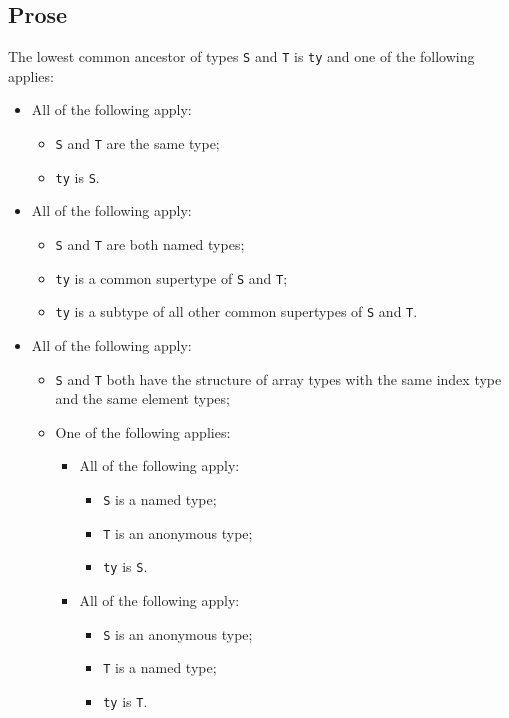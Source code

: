 \documentclass{book}
\begin{document}
\subsection{Prose}
  The lowest common ancestor of types \texttt{S} and \texttt{T} is \texttt{ty} and one of the following applies:
  \begin{itemize}
  \item All of the following apply:
    \begin{itemize}
    \item \texttt{S} and \texttt{T} are the same type;
    \item \texttt{ty} is \texttt{S}.
    \end{itemize}

  \item All of the following apply:
    \begin{itemize}
    \item \texttt{S} and \texttt{T} are both named types;
    \item \texttt{ty} is a common supertype of \texttt{S} and \texttt{T};
    \item \texttt{ty} is a subtype of all other common supertypes of \texttt{S} and \texttt{T}.
    \end{itemize}

  \item All of the following apply:
    \begin{itemize}
    \item \texttt{S} and \texttt{T} both have the structure of array types with the same index type
      and the same element types;

    \item One of the following applies:
      \begin{itemize}
      \item All of the following apply:
        \begin{itemize}
        \item \texttt{S} is a named type;
        \item \texttt{T} is an anonymous type;
        \item \texttt{ty} is \texttt{S}.
        \end{itemize}

      \item All of the following apply:
        \begin{itemize}
        \item \texttt{S} is an anonymous type;
        \item \texttt{T} is a named type;
        \item \texttt{ty} is \texttt{T}.
        \end{itemize}
      \end{itemize}
    \end{itemize}


\end{itemize}
\end{document}
